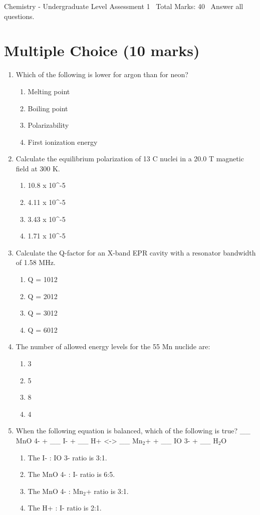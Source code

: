 \documentclass[12pt]{article}
\begin{document}
\begin{center}
Chemistry - Undergraduate Level Assessment 1 \
Total Marks: 40 \
Answer all questions.
\end{center}

\section*{Multiple Choice (10 marks)}
\begin{enumerate}[label=\arabic*.]
\item Which of the following is lower for argon than for neon?
\begin{enumerate}[label=(\alph*)]
    \item Melting point
    \item Boiling point
    \item Polarizability
    \item First ionization energy
\end{enumerate}
\item Calculate the equilibrium polarization of 13 C nuclei in a 20.0 T magnetic field at 300 K.
\begin{enumerate}[label=(\alph*)]
    \item 10.8 x 10^-5
    \item 4.11 x 10^-5
    \item 3.43 x 10^-5
    \item 1.71 x 10^-5
\end{enumerate}
\item Calculate the Q-factor for an X-band EPR cavity with a resonator bandwidth of 1.58 MHz.
\begin{enumerate}[label=(\alph*)]
    \item Q = 1012
    \item Q = 2012
    \item Q = 3012
    \item Q = 6012
\end{enumerate}
\item The number of allowed energy levels for the 55 Mn nuclide are:
\begin{enumerate}[label=(\alph*)]
    \item 3
    \item 5
    \item 8
    \item 4
\end{enumerate}
\item When the following equation is balanced, which of the following is true? \_\_ MnO 4- + \_\_ I- + \_\_ H+ \textless{}-\textgreater{} \_\_ Mn$_{2}$+ + \_\_ IO 3- + \_\_ H$_{2}$O
\begin{enumerate}[label=(\alph*)]
    \item The I- : IO 3- ratio is 3:1.
    \item The MnO 4- : I- ratio is 6:5.
    \item The MnO 4- : Mn$_{2}$+ ratio is 3:1.
    \item The H+ : I- ratio is 2:1.
\end{enumerate}
\end{enumerate}
\end{document}
